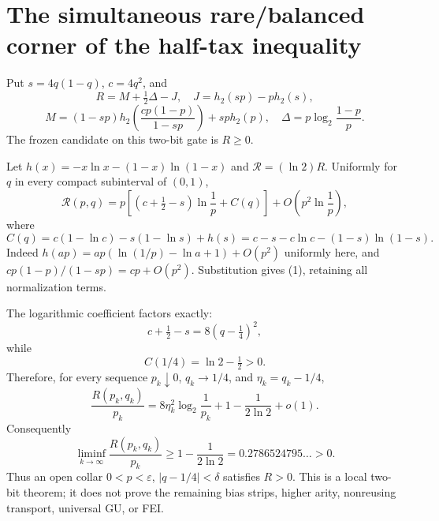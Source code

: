 \documentclass{article}
\begin{document}
\section*{The simultaneous rare/balanced corner of the half-tax inequality}
Put \(s=4q(1-q)\), \(c=4q^2\), and
\[
R=M+\tfrac12\Delta-J,
\quad J=h_2(sp)-p h_2(s),
\]
\[
M=(1-sp)h_2\!\left(\frac{cp(1-p)}{1-sp}\right)+sp h_2(p),
\quad \Delta=p\log_2\frac{1-p}{p}.
\]
The frozen candidate on this two-bit gate is \(R\ge0\).

Let \(h(x)=-x\ln x-(1-x)\ln(1-x)\) and
\(\mathcal R=(\ln2)R\). Uniformly for \(q\) in every compact
subinterval of \((0,1)\),
\[
\mathcal R(p,q)=p\left[(c+\tfrac12-s)\ln\frac1p+C(q)\right]
+O\!\left(p^2\ln\frac1p\right),                                      \tag{1}
\]
where
\[
C(q)=c(1-\ln c)-s(1-\ln s)+h(s)
=c-s-c\ln c-(1-s)\ln(1-s).                                           \tag{2}
\]
Indeed \(h(ap)=ap(\ln(1/p)-\ln a+1)+O(p^2)\) uniformly here, and
\(cp(1-p)/(1-sp)=cp+O(p^2)\). Substitution gives (1), retaining all
normalization terms.

The logarithmic coefficient factors exactly:
\[
c+\tfrac12-s=8(q-\tfrac14)^2,                                        \tag{3}
\]
while
\[
C(1/4)=\ln2-\tfrac12>0.                                               \tag{4}
\]
Therefore, for every sequence \(p_k\downarrow0\), \(q_k\to1/4\), and
\(\eta_k=q_k-1/4\),
\[
\frac{R(p_k,q_k)}{p_k}
=8\eta_k^2\log_2\frac1{p_k}
+1-\frac1{2\ln2}+o(1).                                                \tag{5}
\]
Consequently
\[
\liminf_{k\to\infty}\frac{R(p_k,q_k)}{p_k}
\ge1-\frac1{2\ln2}=0.2786524795\ldots>0.                              \tag{6}
\]
Thus an open collar \(0<p<\varepsilon\), \(|q-1/4|<\delta\) satisfies
\(R>0\). This is a local two-bit theorem; it does not prove the remaining
bias strips, higher arity, nonreusing transport, universal GU, or FEI.
\end{document}
